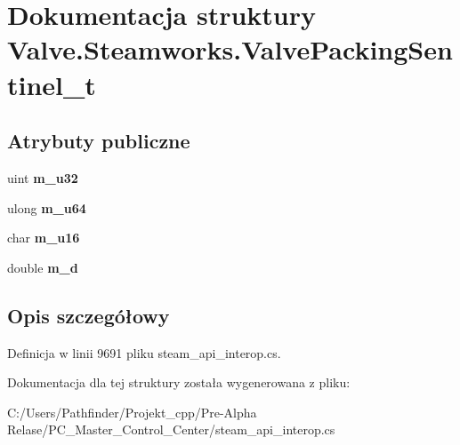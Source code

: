 \hypertarget{struct_valve_1_1_steamworks_1_1_valve_packing_sentinel__t}{}\section{Dokumentacja struktury Valve.\+Steamworks.\+Valve\+Packing\+Sentinel\+\_\+t}
\label{struct_valve_1_1_steamworks_1_1_valve_packing_sentinel__t}
\subsection*{Atrybuty publiczne}
\begin{DoxyCompactItemize}
\item 
\mbox{\label{struct_valve_1_1_steamworks_1_1_valve_packing_sentinel__t_aae484ccf066d91599f01acdac3204a51}} 
uint {\bfseries m\+\_\+u32}
\item 
\mbox{\label{struct_valve_1_1_steamworks_1_1_valve_packing_sentinel__t_ae32aea2b10ddf82e2e1e364ff433a0c1}} 
ulong {\bfseries m\+\_\+u64}
\item 
\mbox{\label{struct_valve_1_1_steamworks_1_1_valve_packing_sentinel__t_af75626ac4e1cf1c7dbd67025582484dd}} 
char {\bfseries m\+\_\+u16}
\item 
\mbox{\label{struct_valve_1_1_steamworks_1_1_valve_packing_sentinel__t_a05c36602c56a21c3b48c8f98efaf4685}} 
double {\bfseries m\+\_\+d}
\end{DoxyCompactItemize}


\subsection{Opis szczegółowy}


Definicja w linii 9691 pliku steam\+\_\+api\+\_\+interop.\+cs.



Dokumentacja dla tej struktury została wygenerowana z pliku\+:\begin{DoxyCompactItemize}
\item 
C\+:/\+Users/\+Pathfinder/\+Projekt\+\_\+cpp/\+Pre-\/\+Alpha Relase/\+P\+C\+\_\+\+Master\+\_\+\+Control\+\_\+\+Center/steam\+\_\+api\+\_\+interop.\+cs\end{DoxyCompactItemize}
